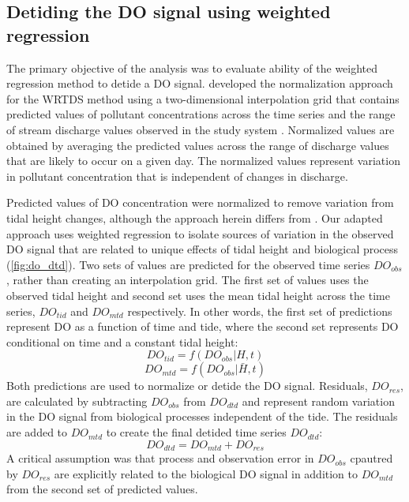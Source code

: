 \subsection{Detiding the \ac{DO} signal using weighted regression}

The primary objective of the analysis was to evaluate ability of the weighted regression method to detide a \ac{DO} signal.  \citet{Hirsch10} developed the normalization approach for the \ac{WRTDS} method using a two-dimensional interpolation grid that contains predicted values of pollutant concentrations across the time series and the range of stream discharge values observed in the study system \citep{Hirsch10}.  Normalized values are obtained by averaging the predicted values across the range of discharge values that are likely to occur on a given day.  The normalized values represent variation in pollutant concentration that is independent of changes in discharge.  

Predicted values of \ac{DO} concentration were normalized to remove variation from tidal height changes, although the approach herein differs from \citet{Hirsch10}.  Our adapted approach uses weighted regression to isolate sources of variation in the observed \ac{DO} signal that are related to unique effects of tidal height and biological process (\cref{fig:do_dtd}).  Two sets of values are predicted for the observed time series $DO_{obs}$, rather than creating an interpolation grid.  The first set of values uses the observed tidal height and second set uses the mean tidal height across the time series, $DO_{tid}$ and $DO_{mtd}$ respectively.  In other words, the first set of predictions represent \ac{DO} as a function of time and tide, where the second set represents \ac{DO} conditional on time and a constant tidal height:
\begin{equation} \label{do_tid}
DO_{tid} = f(DO_{obs}|H, t)
\end{equation}
\begin{equation} \label{do_mtd}
DO_{mtd} = f(DO_{obs}|\bar{H}, t)
\end{equation}
Both predictions are used to normalize or detide the \ac{DO} signal.  Residuals, $DO_{res}$, are calculated by subtracting $DO_{obs}$ from $DO_{dtd}$ and represent random variation in the \ac{DO} signal from biological processes independent of the tide. The residuals are added to $DO_{mtd}$ to create the final detided time series $DO_{dtd}$:
\begin{equation} \label{do_dtd}
DO_{dtd} = DO_{mtd} + DO_{res}
\end{equation}
A critical assumption was that process and observation error in $DO_{obs}$ cpautred by $DO_{res}$ are explicitly related to the biological \ac{DO} signal in addition to $DO_{mtd}$ from the second set of predicted values. 
